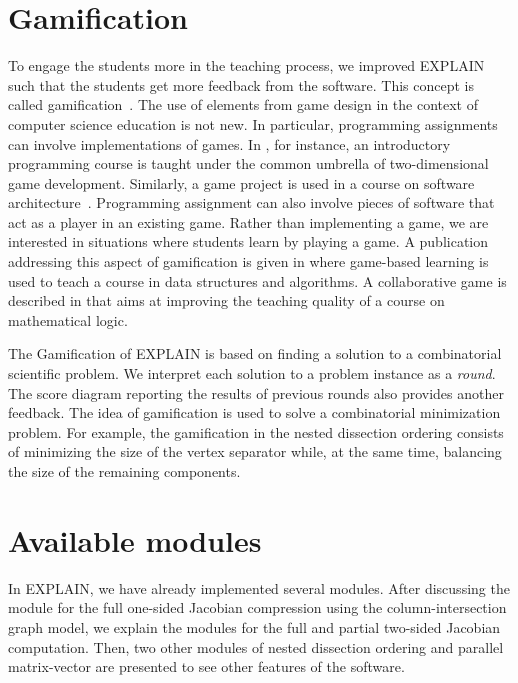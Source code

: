 \documentclass[12pt, twoside,a4paper,toc=bibliography]{scrbook}
\begin{document}
\section{Gamification}
\label{s.game}
To engage the students more in the teaching process, we improved EXPLAIN such that the students get
more feedback from the software. 
This concept is called gamification~\cite{deterding2011:gug,deterding2011}.
The use of elements from game design in the context of
computer science education is not new. In particular, programming assignments can involve
implementations of games. In \cite{la2007:gfa}, for instance, an introductory programming course is
taught under the common umbrella of two-dimensional game development. Similarly, a game project is
used in a course on software architecture~\cite{Wang2011:EEU}. Programming assignment can also
involve pieces of software that act as a player in an existing game. Rather than implementing a game, we are
interested in situations where students learn by playing a game. 
A publication addressing this aspect of gamification is given in
\cite{Hakulinen2011:usg} where game-based learning is used to teach a course in data structures and
algorithms. A collaborative game is described in \cite{shl:bsc} that aims at improving the teaching
quality of a course on mathematical logic.

The Gamification of \mbox{EXPLAIN} is based on finding a solution to a combinatorial scientific problem.
We interpret each solution to a problem instance as a \textit{round}.
The score diagram reporting the results of previous
rounds also provides another feedback. The idea of gamification is used to solve a combinatorial
minimization problem. For example, the gamification in the nested dissection ordering 
consists of minimizing the size of the vertex separator while, at the same
time, balancing the size of the remaining components.


\section{Available modules}
\label{s.av.modules}
In \mbox{EXPLAIN}, we have already implemented several modules.
After discussing the module for the full one-sided Jacobian compression using the column-intersection graph model,
we explain the modules for the full and partial two-sided Jacobian computation. 
Then, two other modules of nested dissection ordering and parallel matrix-vector
are presented to see other features of the software.
\end{document}
